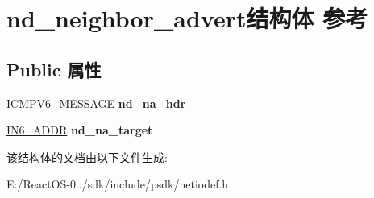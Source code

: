 \hypertarget{structnd__neighbor__advert}{}\section{nd\+\_\+neighbor\+\_\+advert结构体 参考}
\label{structnd__neighbor__advert}
\subsection*{Public 属性}
\begin{DoxyCompactItemize}
\item 
\mbox{\label{structnd__neighbor__advert_a18a984178575395aaa37dc4dfa20c983}} 
\hyperlink{struct___i_c_m_p___m_e_s_s_a_g_e}{I\+C\+M\+P\+V6\+\_\+\+M\+E\+S\+S\+A\+GE} {\bfseries nd\+\_\+na\+\_\+hdr}
\item 
\mbox{\label{structnd__neighbor__advert_a6652a12186f434cf67f8f639c4abeeb8}} 
\hyperlink{structin6__addr}{I\+N6\+\_\+\+A\+D\+DR} {\bfseries nd\+\_\+na\+\_\+target}
\end{DoxyCompactItemize}


该结构体的文档由以下文件生成\+:\begin{DoxyCompactItemize}
\item 
E\+:/\+React\+O\+S-\/0../sdk/include/psdk/netiodef.\+h\end{DoxyCompactItemize}

